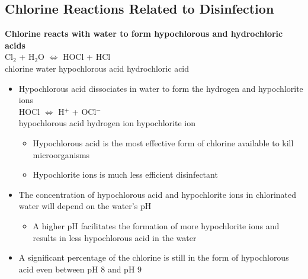 \subsection{Chlorine Reactions Related to Disinfection}
\textbf{Chlorine reacts with water to form hypochlorous and hydrochloric acids}\\
Cl$_2$ \hspace{0.8cm}	+ \hspace{0.3 cm}	 H$_2$O		\hspace{0.8cm} $\iff$ 
\hspace{0.8cm} HOCl	\hspace{0.8cm}	 +	\hspace{0.8cm}	 HCl \\
chlorine \hspace{0.8cm}	water \hspace{1.8cm}		 hypochlorous acid	\hspace{0.1cm}	 hydrochloric acid\\ 
	\vspace{0.5cm}
	\begin{itemize}
		\item Hypochlorous acid dissociates in water to form the hydrogen and hypochlorite ions\\
 HOCl \hspace{1.8 cm} $\iff$ \hspace{1.8 cm} H$^+$ \hspace{1.8cm} + 	\hspace{0.8cm}OCl$^-$\\ 
hypochlorous acid  \hspace{1.9 cm}      hydrogen ion   \hspace{1.5cm}           hypochlorite ion

		\begin{itemize}
			\item Hypochlorous acid is the most effective form of chlorine available to kill microorganisms
			\item Hypochlorite ions is much less efficient disinfectant
		\end{itemize}

		\item The concentration of hypochlorous acid and hypochlorite ions in chlorinated water will depend on the water's pH
		\begin{itemize}
			\item A higher pH facilitates the formation of more hypochlorite ions and results in less hypochlorous acid in the water
		\end{itemize}
		\item A significant percentage of the chlorine is still in the form of hypochlorous acid even between pH 8 and pH 9
		\end{itemize}



